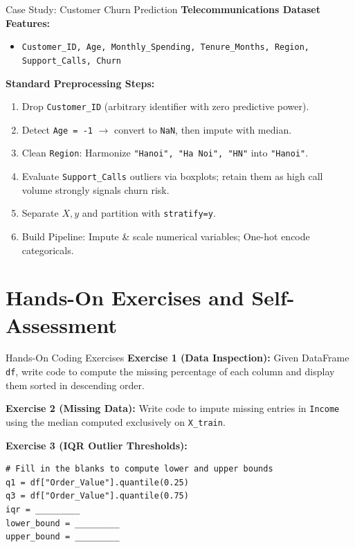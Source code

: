 \documentclass[aspectratio=169,11pt]{beamer}
\newcommand{\code}[1]{\texttt{#1}}
\newcommand{\smallgap}{\vspace{0.35em}}
\begin{document}
\begin{frame}{Case Study: Customer Churn Prediction}
\textbf{Telecommunications Dataset Features:}
\begin{itemize}
  \item \code{Customer\_ID, Age, Monthly\_Spending, Tenure\_Months, Region, Support\_Calls, Churn}
\end{itemize}

\textbf{Standard Preprocessing Steps:}
\begin{enumerate}
  \item Drop \code{Customer\_ID} (arbitrary identifier with zero predictive power).
  \item Detect \code{Age = -1} $\rightarrow$ convert to \code{NaN}, then impute with median.
  \item Clean \code{Region}: Harmonize \code{"Hanoi", "Ha Noi", "HN"} into \code{"Hanoi"}.
  \item Evaluate \code{Support\_Calls} outliers via boxplots; retain them as high call volume strongly signals churn risk.
  \item Separate $X, y$ and partition with \code{stratify=y}.
  \item Build Pipeline: Impute \& scale numerical variables; One-hot encode categoricals.
\end{enumerate}
\end{frame}

\section{Hands-On Exercises and Self-Assessment}

\begin{frame}[fragile]{Hands-On Coding Exercises}
\textbf{Exercise 1 (Data Inspection):} Given DataFrame \code{df}, write code to compute the missing percentage of each column and display them sorted in descending order.

\smallgap
\textbf{Exercise 2 (Missing Data):} Write code to impute missing entries in \code{Income} using the median computed exclusively on \code{X\_train}.

\smallgap
\textbf{Exercise 3 (IQR Outlier Thresholds):}
\begin{lstlisting}[style=pythonstyle]
# Fill in the blanks to compute lower and upper bounds
q1 = df["Order_Value"].quantile(0.25)
q3 = df["Order_Value"].quantile(0.75)
iqr = _________
lower_bound = _________
upper_bound = _________
\end{lstlisting}
\end{frame}
\end{document}
